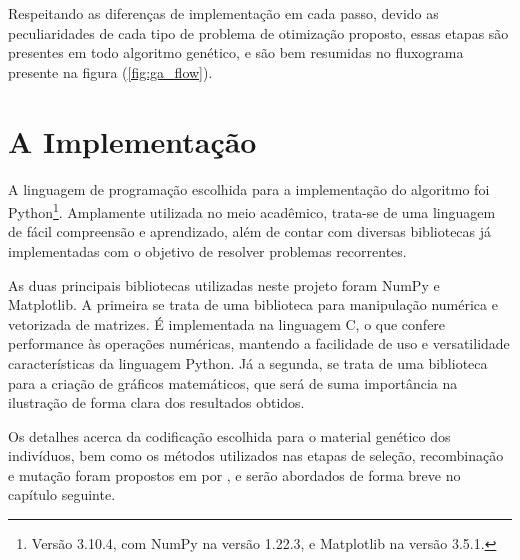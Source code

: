 Respeitando as diferenças de implementação em cada passo, devido as peculiaridades de cada tipo de problema
de otimização proposto, essas etapas são presentes em todo algoritmo genético, e são bem resumidas no fluxograma
presente na figura (\ref{fig:ga_flow}).



\section{A Implementação}

A linguagem de programação escolhida para a implementação do algoritmo foi Python\footnote{
  Versão 3.10.4, com NumPy na versão 1.22.3, e Matplotlib na versão 3.5.1.
}. Amplamente utilizada no meio 
acadêmico, trata-se de uma linguagem de fácil compreensão e aprendizado, além de contar com diversas bibliotecas
já implementadas com o objetivo de resolver problemas recorrentes.

As duas principais bibliotecas utilizadas neste projeto foram NumPy\cite{harris2020array} e Matplotlib\cite{hunter2007}. 
A primeira se trata de uma biblioteca para manipulação numérica e vetorizada de matrizes. É implementada na linguagem C, 
o que confere performance às operações numéricas, mantendo a facilidade de uso e versatilidade características da linguagem
Python. Já a segunda, se trata de uma biblioteca para a criação de gráficos matemáticos, que será de suma importância
na ilustração de forma clara dos resultados obtidos.

Os detalhes acerca da codificação escolhida para o material genético dos indivíduos, bem como os métodos utilizados
nas etapas de seleção, recombinação e mutação foram propostos em \citeyear{roncaratti2006ga} por \citeauthor{roncaratti2006ga},
e serão abordados de forma breve no capítulo seguinte.
